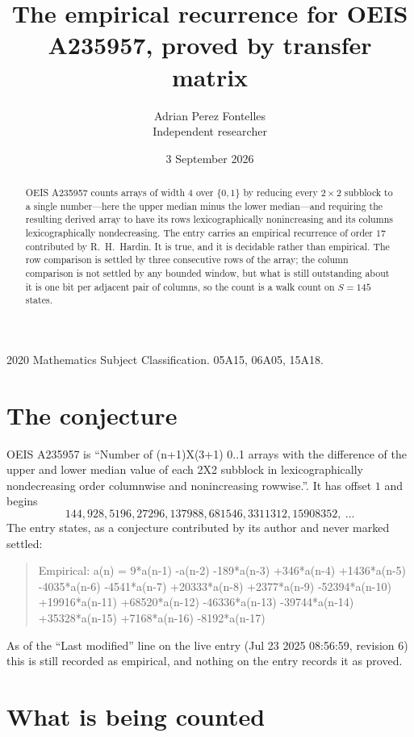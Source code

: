 \documentclass[11pt,a4paper]{article}
\title{The empirical recurrence for OEIS A235957, proved by transfer matrix}
\author{Adrian Perez Fontelles\\ \small Independent researcher}
\date{3 September 2026}
\theoremstyle{plain}
\theoremstyle{definition}
\begin{document}
\maketitle

\begin{abstract}
OEIS A235957 counts arrays of width $4$ over $\{0,1\}$ by reducing every $2\times2$ subblock to a
single number---here the upper median minus the lower median---and requiring the resulting derived array to have its rows
lexicographically nonincreasing and its columns lexicographically nondecreasing. The entry carries an
empirical recurrence of order $17$ contributed by R.~H.~Hardin. It is true, and it is
decidable rather than empirical. The row comparison is settled by three consecutive rows of the
array; the column comparison is not settled by any bounded window, but what is still outstanding
about it is one bit per adjacent pair of columns, so the count is a walk count on $S=145$
states.
\end{abstract}

\noindent\small 2020 Mathematics Subject Classification. 05A15, 06A05, 15A18.\normalsize

\section{The conjecture}

OEIS A235957 is ``Number of (n+1)X(3+1) 0..1 arrays with the difference of the upper and lower median value of each 2X2 subblock in lexicographically nondecreasing order columnwise and nonincreasing rowwise.''. It has offset $1$ and begins
\[
144, 928, 5196, 27296, 137988, 681546, 3311312, 15908352,\ \dots
\]
The entry states, as a conjecture contributed by its author and never marked settled:
\begin{quote}
Empirical: a(n) = 9*a(n-1) -a(n-2) -189*a(n-3) +346*a(n-4) +1436*a(n-5) -4035*a(n-6) -4541*a(n-7) +20333*a(n-8) +2377*a(n-9) -52394*a(n-10) +19916*a(n-11) +68520*a(n-12) -46336*a(n-13) -39744*a(n-14) +35328*a(n-15) +7168*a(n-16) -8192*a(n-17)
\end{quote}
As of the ``Last modified'' line on the live entry (Jul 23 2025 08:56:59, revision 6) this is still
recorded as empirical, and nothing on the entry records it as proved.

\section{What is being counted}
\end{document}
